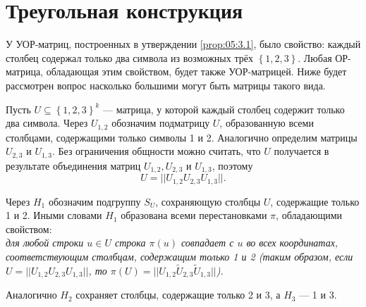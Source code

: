 \section{Треугольная конструкция}\label{triangle_construction}

У УОР-матриц, построенных в утверждении \ref{prop:05:3.1}, было свойство: каждый столбец содержал только два символа из возможных трёх $\left\{ 1,2,3 \right\}$. Любая ОР-матрица, обладающая этим свойством, будет также УОР-матрицей. Ниже будет рассмотрен вопрос насколько большими могут быть матрицы такого вида.

Пусть $U \subseteq \left\{ 1,2,3 \right\}^k$ --- матрица, у которой каждый столбец содержит только два символа. Через $U_{1,2}$ обозначим подматрицу $U$, образованную всеми столбцами, содержащими только символы 1 и 2. Аналогично определим матрицы $U_{2,3}$ и $U_{1,3}$. Без ограничения общности можно считать, что $U$ получается в результате объединения матриц $U_{1,2}, U_{2,3}$ и $U_{1,3}$, поэтому
\[
	U = ||U_{1,2} U_{2,3} U_{1,3}||.
\]

Через $H_1$ обозначим подгруппу $S_U$, сохраняющую столбцы $U$, содержащие только 1 и 2. Иными словами $H_1$ образована всеми перестановками $\pi$, обладающими свойством:\\
\textit{для любой строки $u \in U$ строка $\pi(u)$ совпадает с $u$ во всех координатах, соответствующим столбцам, содержащим только 1 и 2 (таким образом, если $U = ||U_{1,2} U_{2,3} U_{1,3}||$, то $\pi(U) = ||U_{1,2} \widetilde{U}_{2,3} \widetilde{U}_{1,3}||$).}

Аналогично $H_2$ сохраняет столбцы, содержащие только 2 и 3, а $H_3$ --- 1 и 3.

